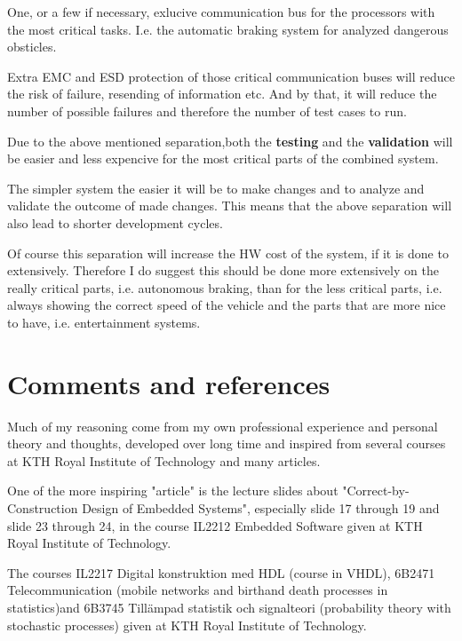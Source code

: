 \documentclass[10pt]{article}
\begin{document}
\medskip

One, or a few if necessary, exlucive communication bus for the processors with the most critical tasks. I.e. the automatic braking system for analyzed dangerous obsticles.

\medskip

Extra EMC and ESD protection of those critical communication buses will reduce the risk of failure, resending of information etc. And by that, it will reduce the number of possible failures and therefore the number of test cases to run.

\medskip

Due to the above mentioned separation,both the \textbf{testing} and the \textbf{validation} will be easier and less expencive for the most critical parts of the combined system.

\medskip
The simpler system the easier it will be to make changes and to analyze and validate the outcome of made changes. This means that the above separation will also lead to shorter development cycles.

\medskip

Of course this separation will increase the HW cost of the system, if it is done to extensively. Therefore I do suggest this should be done more extensively on the really critical parts, i.e. autonomous braking, than for the less critical parts, i.e. always showing the correct speed of the vehicle and the parts that are more nice to have, i.e. entertainment systems.

\section{Comments and references}
Much of my reasoning come from my own professional experience and personal theory and thoughts, developed over long time and inspired from several courses at KTH Royal Institute of Technology and many articles.

\medskip

One of the more inspiring "article" is the lecture slides about "Correct-by-Construction Design of Embedded Systems", especially slide 17 through 19 and slide 23 through 24, in the course IL2212 Embedded Software given at KTH Royal Institute of Technology.

\medskip

The courses IL2217 Digital konstruktion med HDL (course in VHDL), 6B2471 Telecommunication (mobile networks and birthand death processes in statistics)and 6B3745 Tillämpad statistik och signalteori (probability theory with stochastic processes) given at KTH Royal Institute of Technology.
\end{document}
